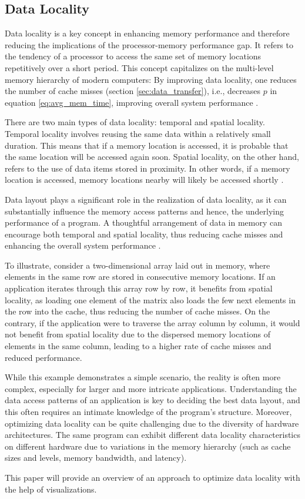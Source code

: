 \subsection{Data Locality}\label{sec:data_locality}
Data locality is a key concept in enhancing memory performance and therefore reducing the implications of the processor-memory performance gap. It refers to the tendency of a processor to access the same set of memory locations repetitively over a short period. This concept capitalizes on the multi-level memory hierarchy of modern computers: By improving data locality, one reduces the number of cache misses (section \ref{sec:data_transfer}), i.e., decreases $p$ in equation \ref{eq:avg_mem_time}, improving overall system performance \cite{unat2017trends, tate2014programming}.

There are two main types of data locality: temporal and spatial locality. Temporal locality involves reusing the same data within a relatively small duration. This means that if a memory location is accessed, it is probable that the same location will be accessed again soon. Spatial locality, on the other hand, refers to the use of data items stored in proximity. In other words, if a memory location is accessed, memory locations nearby will likely be accessed shortly \cite{esseghir1993improving}.

Data layout plays a significant role in the realization of data locality, as it can substantially influence the memory access patterns and hence, the underlying performance of a program. A thoughtful arrangement of data in memory can encourage both temporal and spatial locality, thus reducing cache misses and enhancing the overall system performance \cite{esseghir1993improving}.

To illustrate, consider a two-dimensional array laid out in memory, where elements in the same row are stored in consecutive memory locations. If an application iterates through this array row by row, it benefits from spatial locality, as loading one element of the matrix also loads the few next elements in the row into the cache, thus reducing the number of cache misses. On the contrary, if the application were to traverse the array column by column, it would not benefit from spatial locality due to the dispersed memory locations of elements in the same column, leading to a higher rate of cache misses and reduced performance.

While this example demonstrates a simple scenario, the reality is often more complex, especially for larger and more intricate applications. Understanding the data access patterns of an application is key to deciding the best data layout, and this often requires an intimate knowledge of the program's structure. Moreover, optimizing data locality can be quite challenging due to the diversity of hardware architectures. The same program can exhibit different data locality characteristics on different hardware due to variations in the memory hierarchy (such as cache sizes and levels, memory bandwidth, and latency).

This paper will provide an overview of an approach to optimize data locality with the help of visualizations.
